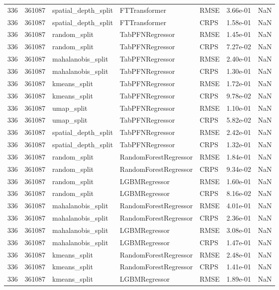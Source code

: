 \begin{tabular}{rrlllrr}
336 & 361087 & spatial\_depth\_split & FTTransformer & RMSE & 3.66e-01 & NaN \\
336 & 361087 & spatial\_depth\_split & FTTransformer & CRPS & 1.58e-01 & NaN \\
336 & 361087 & random\_split & TabPFNRegressor & RMSE & 1.45e-01 & NaN \\
336 & 361087 & random\_split & TabPFNRegressor & CRPS & 7.27e-02 & NaN \\
336 & 361087 & mahalanobis\_split & TabPFNRegressor & RMSE & 2.40e-01 & NaN \\
336 & 361087 & mahalanobis\_split & TabPFNRegressor & CRPS & 1.30e-01 & NaN \\
336 & 361087 & kmeans\_split & TabPFNRegressor & RMSE & 1.72e-01 & NaN \\
336 & 361087 & kmeans\_split & TabPFNRegressor & CRPS & 9.78e-02 & NaN \\
336 & 361087 & umap\_split & TabPFNRegressor & RMSE & 1.10e-01 & NaN \\
336 & 361087 & umap\_split & TabPFNRegressor & CRPS & 5.82e-02 & NaN \\
336 & 361087 & spatial\_depth\_split & TabPFNRegressor & RMSE & 2.42e-01 & NaN \\
336 & 361087 & spatial\_depth\_split & TabPFNRegressor & CRPS & 1.32e-01 & NaN \\
336 & 361087 & random\_split & RandomForestRegressor & RMSE & 1.84e-01 & NaN \\
336 & 361087 & random\_split & RandomForestRegressor & CRPS & 9.34e-02 & NaN \\
336 & 361087 & random\_split & LGBMRegressor & RMSE & 1.60e-01 & NaN \\
336 & 361087 & random\_split & LGBMRegressor & CRPS & 8.16e-02 & NaN \\
336 & 361087 & mahalanobis\_split & RandomForestRegressor & RMSE & 4.01e-01 & NaN \\
336 & 361087 & mahalanobis\_split & RandomForestRegressor & CRPS & 2.36e-01 & NaN \\
336 & 361087 & mahalanobis\_split & LGBMRegressor & RMSE & 3.08e-01 & NaN \\
336 & 361087 & mahalanobis\_split & LGBMRegressor & CRPS & 1.47e-01 & NaN \\
336 & 361087 & kmeans\_split & RandomForestRegressor & RMSE & 2.48e-01 & NaN \\
336 & 361087 & kmeans\_split & RandomForestRegressor & CRPS & 1.41e-01 & NaN \\
336 & 361087 & kmeans\_split & LGBMRegressor & RMSE & 1.89e-01 & NaN \\

\end{tabular}

